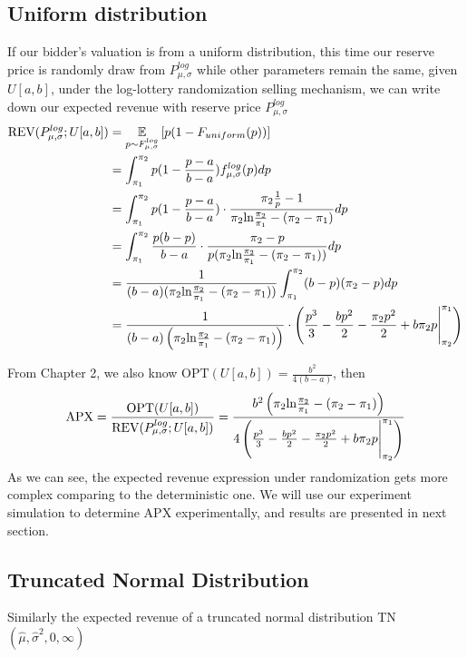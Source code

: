 \subsection{Uniform distribution}
If our bidder's valuation is from a uniform distribution, this time our reserve price is randomly draw from $P^{log}_{\mu,\sigma}$ while other parameters remain the same, given $U[a,b]$, under the log-lottery randomization selling mechanism, we can write down our expected revenue with reserve price $P^{log}_{\mu,\sigma}$  
\begin{equation}\notag
\begin{split}	
	\text{REV}(P^{log}_{\mu,\sigma} ;U[a,b]) &=\underset{ p \sim F^{log}_{\mu,\sigma} }{\mathbb{E}}\left[ p(1-F_{uniform}(p))\right] \\ &= \int_{\pi_1}^{\pi_2} p(1 -  \frac{p-a}{b-a})f^{log}_{\mu,\sigma}(p)dp\\ &=\int_{\pi_1}^{\pi_2} p(1 -  \frac{p-a}{b-a}) \cdot \frac{\pi_2\frac{1}{p} -1}{\pi_2 \text{ln}\frac{\pi_2}{\pi_1} - (\pi_2-\pi_1)} dp \\&=\int_{\pi_1}^{\pi_2} \frac{p(b-p)}{b-a} \cdot \frac{\pi_2 -p}{p(\pi_2 \text{ln}\frac{\pi_2}{\pi_1} - (\pi_2-\pi_1))} dp \\&=  \frac{1}{(b-a)(\pi_2 \text{ln}\frac{\pi_2}{\pi_1} - (\pi_2-\pi_1))}\int_{\pi_1}^{\pi_2} (b-p)(\pi_2-p)dp\\&=  \frac{1}{(b-a)\left(\pi_2 \text{ln}\frac{\pi_2}{\pi_1} - (\pi_2-\pi_1)\right)} \cdot \left( \frac{p^3}{3} -\frac{bp^2}{2} -\frac{\pi_2p^2}{2} + b\pi_2 p \Biggr|_{\pi_2}^{\pi_1} \right)              
\end{split}
\end{equation} 

From Chapter 2, we also know $\text{OPT}(U[a,b]) = \frac{b^{2}}{4(b-a)}$, then
\begin{equation}\notag
    \text{APX} = \frac{\text{OPT}(U[a,b])}{\text{REV}(P^{log}_{\mu,\sigma} ;U[a,b])} = \frac{b^2\left(\pi_2 \text{ln}\frac{\pi_2}{\pi_1} - (\pi_2-\pi_1)\right)}{4\left( \frac{p^3}{3} -\frac{bp^2}{2} -\frac{\pi_2p^2}{2} + b\pi_2 p \Biggr|_{\pi_2}^{\pi_1} \right)  }
\end{equation}
As we can see, the expected revenue expression under randomization gets more complex comparing to the deterministic one. We will use our experiment simulation to determine APX experimentally, and results are presented in next section. 

\subsection{Truncated Normal Distribution}
Similarly the expected revenue of a truncated normal distribution TN$(\hat{\mu}, \hat{\sigma}^2, 0, \infty)$

